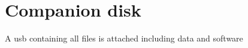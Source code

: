 \chapter{Companion disk}

A usb containing all files is attached including data and software 

\cleardoublepage